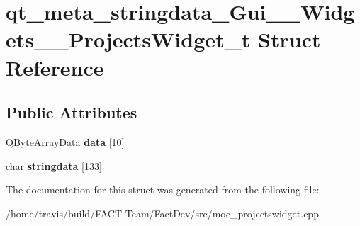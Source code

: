 \hypertarget{structqt__meta__stringdata__Gui____Widgets____ProjectsWidget__t}{\section{qt\-\_\-meta\-\_\-stringdata\-\_\-\-Gui\-\_\-\-\_\-\-Widgets\-\_\-\-\_\-\-Projects\-Widget\-\_\-t Struct Reference}
\label{structqt__meta__stringdata__Gui____Widgets____ProjectsWidget__t}
}
\subsection*{Public Attributes}
\begin{DoxyCompactItemize}
\item 
\hypertarget{structqt__meta__stringdata__Gui____Widgets____ProjectsWidget__t_a0573789ee93d0f5384357dca6ab44eec}{Q\-Byte\-Array\-Data {\bfseries data} \mbox{[}10\mbox{]}}\label{structqt__meta__stringdata__Gui____Widgets____ProjectsWidget__t_a0573789ee93d0f5384357dca6ab44eec}

\item 
\hypertarget{structqt__meta__stringdata__Gui____Widgets____ProjectsWidget__t_a5fc5cabb8e30510a2f91711b70cdadf3}{char {\bfseries stringdata} \mbox{[}133\mbox{]}}\label{structqt__meta__stringdata__Gui____Widgets____ProjectsWidget__t_a5fc5cabb8e30510a2f91711b70cdadf3}

\end{DoxyCompactItemize}


The documentation for this struct was generated from the following file\-:\begin{DoxyCompactItemize}
\item 
/home/travis/build/\-F\-A\-C\-T-\/\-Team/\-Fact\-Dev/src/moc\-\_\-projectswidget.\-cpp\end{DoxyCompactItemize}
